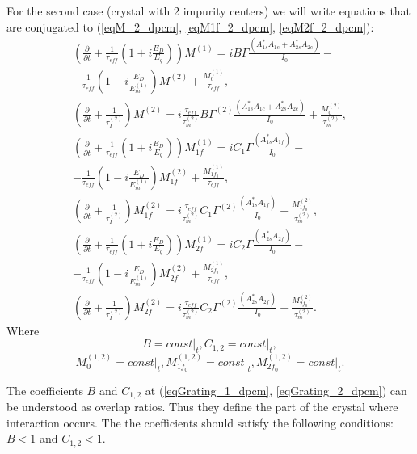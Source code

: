 For the second case (crystal with 2 impurity centers) we will write
equations that are conjugated to 
(\ref{eqM_2_dpcm}, \ref{eqM1f_2_dpcm}, 
\ref{eqM2f_2_dpcm}):
\begin{eqnarray}
\left(\frac{\partial}{\partial{t}} 
+\frac{1}{\tau_{eff}}
\left(
1 + i \frac{E_D}{E_q}
\right)
\right){M^{(1)}} 
= 
i B \Gamma \frac{(A_{1s}^{\ast} A_{1c}+A_{2s}^{\ast} A_{2c})}{I_0}
-
\nonumber \\
-\frac{1}{\tau_{eff}}
\left(
1 - i \frac{E_D}{E_m^{(1)}}
\right) M^{(2)}
+ \frac{M_0^{(1)}}{\tau_{eff}},
\nonumber \\
\left(
\frac{\partial}{\partial{t}} + \frac{1}{\tau_I^{(2)}}
\right) 
{M^{(2)}} 
= i \frac{\tau_{eff}}{\tau_m^{(2)}}
 B \Gamma^{(2)} \frac{(A_{1s}^{\ast} A_{1c}+A_{2s}^{\ast} A_{2c})}{I_0}
+ \frac{M_0^{(2)}}{\tau_{m}^{(2)}}
,
\nonumber \\
\left(\frac{\partial}{\partial{t}} 
+\frac{1}{\tau_{eff}}
\left(
1 + i \frac{E_D}{E_q}
\right)
\right){M_{1f}^{(1)}} 
= 
i C_1 \Gamma \frac{(A_{1s}^{\ast} A_{1f})}{I_0}
-
\nonumber \\
- \frac{1}{\tau_{eff}}
\left(
1 - i \frac{E_D}{E_m^{(1)}}
\right) M_{1f}^{(2)}
+ \frac{M_{1f_0}^{(1)}}{\tau_{eff}},
\nonumber \\
\left(
\frac{\partial}{\partial{t}} + \frac{1}{\tau_I^{(2)}}
\right) 
{M_{1f}^{(2)}} 
= i \frac{\tau_{eff}}{\tau_m^{(2)}}
C_1 \Gamma^{(2)} \frac{(A_{1s}^{\ast} A_{1f})}{I_0}
+ \frac{M_{1f_0}^{(2)}}{\tau_{m}^{(2)}}
,
\nonumber \\
\left(\frac{\partial}{\partial{t}} 
+\frac{1}{\tau_{eff}}
\left(
1 + i \frac{E_D}{E_q}
\right)
\right){M_{2f}^{(1)}} 
= 
i C_2 \Gamma \frac{(A_{2s}^{\ast} A_{2f})}{I_0}
-
\nonumber \\
- \frac{1}{\tau_{eff}}
\left(
1 - i \frac{E_D}{E_m^{(1)}}
\right) M_{2f}^{(2)}
+ \frac{M_{2f_0}^{(1)}}{\tau_{eff}},
\nonumber \\
\left(
\frac{\partial}{\partial{t}} + \frac{1}{\tau_I^{(2)}}
\right) 
{M_{2f}^{(2)}} 
= i \frac{\tau_{eff}}{\tau_m^{(2)}}
C_2 \Gamma^{(2)} \frac{(A_{2s}^{\ast} A_{2f})}{I_0}
+ \frac{M_{2f_0}^{(2)}}{\tau_{m}^{(2)}}
.
\label{eqGrating_2_dpcm} 
\end{eqnarray}
Where
\[
B = \left.const\right|_t,
C_{1,2} = \left.const\right|_t,
\]
\[
M_0^{(1,2)} = \left.const\right|_t,
M_{1f_0}^{(1,2)} = \left.const\right|_t,
M_{2f_0}^{(1,2)} = \left.const\right|_t.
\] 

The coefficients $B$ and $C_{1,2}$ at (\ref{eqGrating_1_dpcm},
\ref{eqGrating_2_dpcm}) can be understood as overlap ratios. Thus they
define the part of the crystal where interaction occurs. The the
coefficients should  satisfy the following conditions:
$B < 1$ and $C_{1,2} < 1$.


